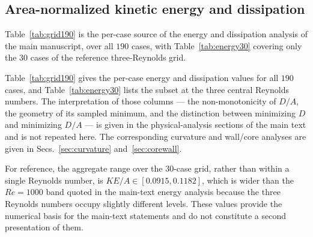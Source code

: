 \documentclass[11pt]{article}
\begin{document}
\subsection{Area-normalized kinetic energy and dissipation}
\color{revred}Table~\ref{tab:grid190} is the per-case source of the energy and dissipation analysis of the main manuscript, over all $190$ cases, with Table~\ref{tab:energy30} covering only the $30$ cases of the reference three-Reynolds grid.\par
\color{revblue}Table~\ref{tab:grid190} gives the per-case energy and dissipation values for all $190$ cases, and Table~\ref{tab:energy30} lists the subset at the three central Reynolds numbers. The interpretation of those columns --- the non-monotonicity of $D/A$, the geometry of its sampled minimum, and the distinction between minimizing $D$ and minimizing $D/A$ --- is given in the physical-analysis sections of the main text and is not repeated here. The corresponding curvature and wall/core analyses are given in Secs.~\ref{sec:curvature} and~\ref{sec:corewall}.\par
\color{black}For reference, the aggregate range over the 30-case grid, rather than within a single Reynolds number, is $KE/A\in[0.0915,0.1182]$, which is wider than the $Re=1000$ band quoted in the main-text energy analysis because the three Reynolds numbers occupy slightly different levels. These values provide the numerical basis for the main-text statements and do not constitute a second presentation of them.
\end{document}
